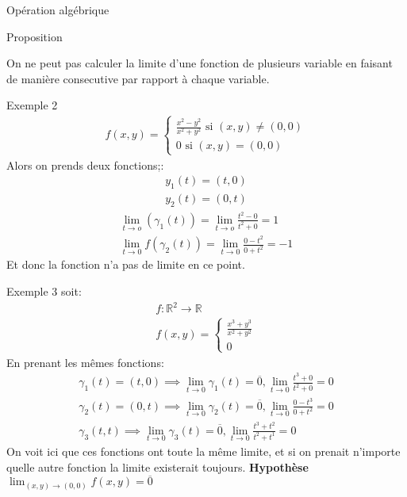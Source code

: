 \begin{parag}{Opération algébrique}
\begin{subparag}{Proposition}
\begin{theoreme}
        \end{theoreme}
       \begin{framedremark}
           On ne peut pas calculer la limite d'une fonction de plusieurs variable en faisant de manière consecutive par rapport à chaque variable.

       \end{framedremark}
        
    \end{subparag}

    \begin{subparag}{Exemple 2}
        \begin{align*}
            f(x, y) = \begin{cases}
                \frac{x^2 - y^2}{x^2 + y^2} \text{ si } (x, y) \neq (0, 0)\\
                0 \text{ si } (x, y) = (0, 0)
            \end{cases}
        \end{align*}
        Alors on prends deux fonctions;:
        \begin{align*}
            y_1(t) = (t, 0)\\
            y_2(t) = (0, t)
        \end{align*}
        \begin{align*}
            \lim_{t \to o}( \gamma_1(t)) = \lim_{t \to o} \frac{t^2 - 0}{t^2 + 0} = 1\\
            \lim_{t \to 0}f( \gamma_2(t)) = \lim_{t \to 0} \frac{0 - t^2}{0 + t^2} = -1
        \end{align*}
       Et donc la fonction n'a pas de limite en ce point.
    \end{subparag}
    \begin{subparag}{Exemple 3}
        soit:
        \begin{align*}
            f: \mathbb{R}^2 \to \mathbb{R}\\
            f(x, y) = \begin{cases}
                \frac{x^3 + y^3}{x^2 + y^2}\\
                0
            \end{cases}
        \end{align*}
        En prenant les mêmes fonctions:
        \begin{align*}
            \gamma_1(t) = (t, 0) \implies \lim_{t \to 0} \gamma_1(t) = \overline{0}, \lim_{t \to 0} \frac{t^3 + 0}{t^2 + 0} = 0\\
            \gamma_2(t) = (0, t) \implies \lim_{ t \to 0} \gamma_2(t) = \overline{0}, \lim_{t \to 0} \frac{0 - t^3}{0 + t^2} = 0\\
                    \gamma_3 (t, t) \implies\lim_{t \to 0} \gamma_3(t) = \overline{0}, \lim_{t \to 0} \frac{t^3 + t^2}{t^2 + t^1} = 0
        \end{align*}
       On voit ici que ces fonctions ont toute la même limite, et si on prenait n'importe quelle autre  fonction la limite existerait toujours.
       \textbf{Hypothèse} $\lim_{(x, y) \to (0, 0)} f(x, y) = \overline{0}$
    \end{subparag}
 \end{parag}
 
